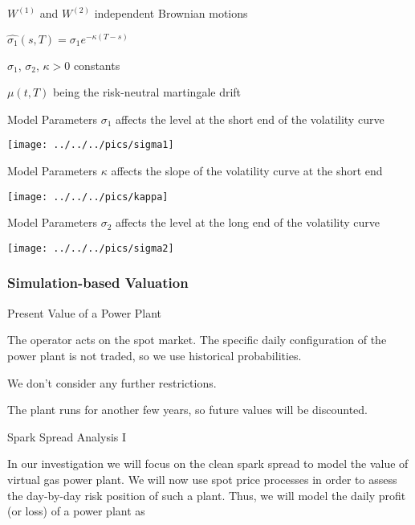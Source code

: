 \item<2-> $W^{(1)}$ and $W^{(2)}$ independent Brownian motions
\item<3-> $\hat{\sigma_1}(s,T)=\sigma_1e^{-\kappa(T-s)}$
\item<4-> $\sigma_1$, $\sigma_2$, $\kappa>0$ constants
\item<5-> $\mu(t,T)$ being the risk-neutral martingale drift

{Model Parameters}
$\sigma_1$ affects the level at the short end of the volatility curve

\begin{center}
\texttt{[image: ../../../pics/sigma1]}
\end{center}

{Model Parameters}
$\kappa$ affects the slope of the volatility curve at the short end

\begin{center}
\texttt{[image: ../../../pics/kappa]}
\end{center}

{Model Parameters}
$\sigma_2$ affects the level at the long end of the volatility curve

\begin{center}
\texttt{[image: ../../../pics/sigma2]}
\end{center}

\subsubsection{Simulation-based Valuation}

{Present Value of a Power Plant}
\item<1-> The operator acts on the spot market. The specific daily configuration of the power plant is not traded, so we use historical probabilities.
\item<2-> We don't consider any further restrictions.
\item<3-> The plant runs for another few years, so future values will be discounted.

{Spark Spread Analysis I}

In our investigation we will focus on the clean spark spread to model the value of virtual gas power plant. We will now use spot price processes in order to assess the day-by-day risk position of such a plant. Thus, we will model the daily profit (or loss) of a power plant as

